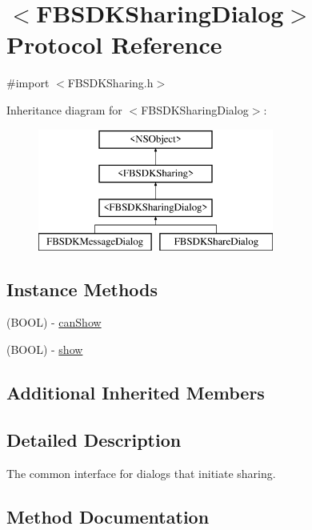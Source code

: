 \hypertarget{protocol_f_b_s_d_k_sharing_dialog-p}{}\section{$<$F\+B\+S\+D\+K\+Sharing\+Dialog$>$ Protocol Reference}
\label{protocol_f_b_s_d_k_sharing_dialog-p}


{\ttfamily \#import $<$F\+B\+S\+D\+K\+Sharing.\+h$>$}

Inheritance diagram for $<$F\+B\+S\+D\+K\+Sharing\+Dialog$>$\+:\begin{figure}[H]
\begin{center}
\leavevmode
\includegraphics[height=4.000000cm]{protocol_f_b_s_d_k_sharing_dialog-p}
\end{center}
\end{figure}
\subsection*{Instance Methods}
\begin{DoxyCompactItemize}
\item 
(B\+O\+O\+L) -\/ \hyperlink{protocol_f_b_s_d_k_sharing_dialog-p_a68ec3b22db7bf5b908fdc12438d38159}{can\+Show}
\item 
(B\+O\+O\+L) -\/ \hyperlink{protocol_f_b_s_d_k_sharing_dialog-p_a442b2571fe59477a403a9e14a7e9c1f6}{show}
\end{DoxyCompactItemize}
\subsection*{Additional Inherited Members}


\subsection{Detailed Description}
The common interface for dialogs that initiate sharing. 

\subsection{Method Documentation}
\hypertarget{protocol_f_b_s_d_k_sharing_dialog-p_a68ec3b22db7bf5b908fdc12438d38159}{}
